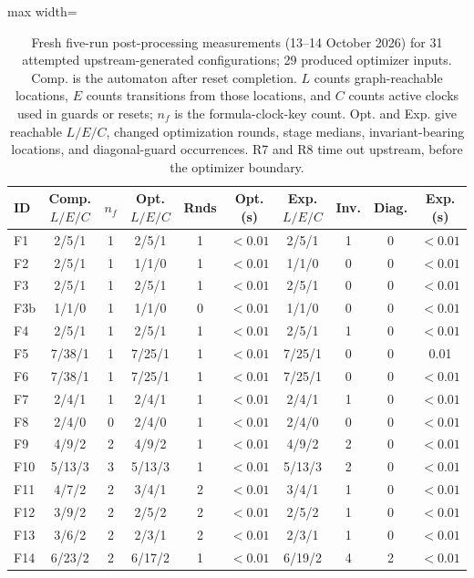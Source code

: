 \begin{table}[t]
\centering
\caption{Fresh five-run post-processing measurements (13--14 October 2026) for 31 attempted upstream-generated configurations; 29 produced optimizer inputs. Comp. is the automaton after reset completion. $L$ counts graph-reachable locations, $E$ counts transitions from those locations, and $C$ counts active clocks used in guards or resets; $n_f$ is the formula-clock-key count. Opt. and Exp. give reachable $L/E/C$, changed optimization rounds, stage medians, invariant-bearing locations, and diagonal-guard occurrences. R7 and R8 time out upstream, before the optimizer boundary.}
\label{tab:optimizer-benchmarks}
\scriptsize
\setlength{\tabcolsep}{3pt}
\begin{adjustbox}{max width=\textwidth}\begin{tabular}{@{}lccccccccc@{}}
\toprule
ID & Comp. $L/E/C$ & $n_f$ & Opt. $L/E/C$ & Rnds & Opt. (s) & Exp. $L/E/C$ & Inv. & Diag. & Exp. (s)\\
\midrule
F1 & 2/5/1 & 1 & 2/5/1 & 1 & $<0.01$ & 2/5/1 & 1 & 0 & $<0.01$\\
F2 & 2/5/1 & 1 & 1/1/0 & 1 & $<0.01$ & 1/1/0 & 0 & 0 & $<0.01$\\
F3 & 2/5/1 & 1 & 2/5/1 & 1 & $<0.01$ & 2/5/1 & 0 & 0 & $<0.01$\\
F3b & 1/1/0 & 1 & 1/1/0 & 0 & $<0.01$ & 1/1/0 & 0 & 0 & $<0.01$\\
F4 & 2/5/1 & 1 & 2/5/1 & 1 & $<0.01$ & 2/5/1 & 1 & 0 & $<0.01$\\
F5 & 7/38/1 & 1 & 7/25/1 & 1 & $<0.01$ & 7/25/1 & 0 & 0 & 0.01\\
F6 & 7/38/1 & 1 & 7/25/1 & 1 & $<0.01$ & 7/25/1 & 0 & 0 & $<0.01$\\
F7 & 2/4/1 & 1 & 2/4/1 & 1 & $<0.01$ & 2/4/1 & 1 & 0 & $<0.01$\\
F8 & 2/4/0 & 0 & 2/4/0 & 1 & $<0.01$ & 2/4/0 & 0 & 0 & $<0.01$\\
F9 & 4/9/2 & 2 & 4/9/2 & 1 & $<0.01$ & 4/9/2 & 2 & 0 & $<0.01$\\
F10 & 5/13/3 & 3 & 5/13/3 & 1 & $<0.01$ & 5/13/3 & 2 & 0 & $<0.01$\\
F11 & 4/7/2 & 2 & 3/4/1 & 2 & $<0.01$ & 3/4/1 & 1 & 0 & $<0.01$\\
F12 & 3/9/2 & 2 & 2/5/2 & 2 & $<0.01$ & 2/5/2 & 1 & 0 & $<0.01$\\
F13 & 3/6/2 & 2 & 2/3/1 & 2 & $<0.01$ & 2/3/1 & 1 & 0 & $<0.01$\\
F14 & 6/23/2 & 2 & 6/17/2 & 1 & $<0.01$ & 6/19/2 & 4 & 2 & $<0.01$\\

\end{tabular}
\end{adjustbox}
\end{table}
